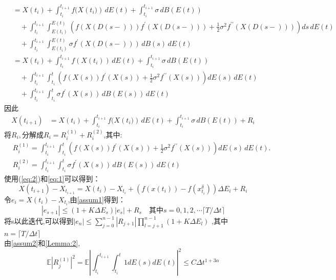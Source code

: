 \documentclass[12pt,final]{article}
\makeatletter
\numberwithin{equation}{section}
\numberwithin{figure}{section}
\numberwithin{table}{section}
\theoremstyle{plain}
\renewcommand{\proofname}{proof}
\theoremstyle{Definition}
\theoremstyle{Remark}
\renewenvironment{proof}[1][\proofname]{\par
	\pushQED{\qed}%
	\normalfont \topsep6\p@\@plus6\p@\relax
	\trivlist\item[\hskip\labelsep
	\bfseries #1\@addpunct{\,:\,}]\ignorespaces
}{%
	\popQED\endtrivlist\@endpefalse
}
\makeatother
\begin{document}
\begin{proof}
\begin{align*}
			&= X(t_i) + \int_{t_i}^{t_{i+1}} f(X({t_i)}) \, dE(t) + \int_{t_i}^{t_{i+1}} \sigma \, dB(E(t)) \\
			&\quad + \int_{t_i}^{t_{i+1}} \int_{E(t_i)}^{E(t)} \left( f(X(D(s-))) f^{\prime}(X(D(s-))) + \frac{1}{2} \sigma^2 f^{\prime\prime}(X(D(s-))) \right) ds \, dE(t) \\
			&\quad + \int_{t_i}^{t_{i+1}} \int_{E(t_i)}^{E(t)}\sigma f^{\prime}(X(D(s-))) \, dB(s) \, dE(t)\\
			&= X(t_i) + \int_{t_i}^{t_{i+1}} f(X({t_i})) \, dE(t) + \int_{t_i}^{t_{i+1}} \sigma \, dB(E(t)) \\
			&\quad + \int_{t_i}^{t_{i+1}} \int_{t_i}^{t} \left( f(X(s)) f^{\prime}(X(s)) + \frac{1}{2} \sigma^2 f^{\prime\prime}(X(s)) \right) dE(s) \, dE(t) \\
			&\quad + \int_{t_i}^{t_{i+1}} \int_{t_i}^{t}\sigma f^{\prime}(X(s)) \, dB(E(s)) \, dE(t)
		\end{align*}
		因此
		\begin{align}\label{eq:2}
			X(t_{i+1})
			&= X(t_i) + \int_{t_i}^{t_{i+1}} f(X({t_i)}) \, dE(t) + \int_{t_i}^{t_{i+1}} \sigma \, dB(E(t)) + R_i
		\end{align}
		将$R_i,$分解成$R_i = R_i^{(1)} + R_i^{(2)}$,其中:
		\begin{align*}
			& R_i^{(1)} = \int_{t_i}^{t_{i+1}} \int_{t_i}^{t} \left( f(X(s)) f^{\prime}(X(s)) + \frac{1}{2} \sigma^2 f^{\prime\prime}(X(s)) \right) dE(s) \, dE(t).\\
			& R_i^{(2)} = \int_{t_i}^{t_{i+1}} \int_{t_i}^{t} \sigma f^{\prime}(X(s)) \, dB(E(s)) \, dE(t)  
		\end{align*}
		使用(\ref{eq:2})和\eqref{eq:1}可以得到：
		\begin{equation}
			X({t_{i+1}})-X_{t_{i+1}}=X({t_i})-X_{t_i}+(f{(x({t_i}))}-f{(x^\delta_{t_i})})\Delta E_{i}+R_{i}
		\end{equation}
		令$e_i = X({t_i})-X_{t_i}$,由\cref{assum1}得到：
		\begin{equation}
			|e_{s+1}|\leq(1+K{\Delta}E_{s})|e_{s}|+R_{s}\quad\text{其中}s=0,1,2,\cdots \lceil T/\Delta t \rceil
		\end{equation}
		将s以此迭代,可以得到$|e_n| \leq \sum\limits_{j=0}^{n-1}|R_{j+1}|\prod_{l=j+1}^{n-1}(1+K\Delta E_l)$
		,其中$n = \lceil T/\Delta t \rceil$\\
		由\cref{assum2}和\cref{Lemma:2},
		\begin{equation}
			\mathbb{E}|R_j^{(1)}|^2 = \mathbb{E} \left| \int_{t_i}^{t_{i+1}}\int_{t_i}^{t}1dE(s)dE(t) \right|^2 \le C \Delta t^{1+3\alpha}

\end{equation}
\end{proof}
\end{document}

